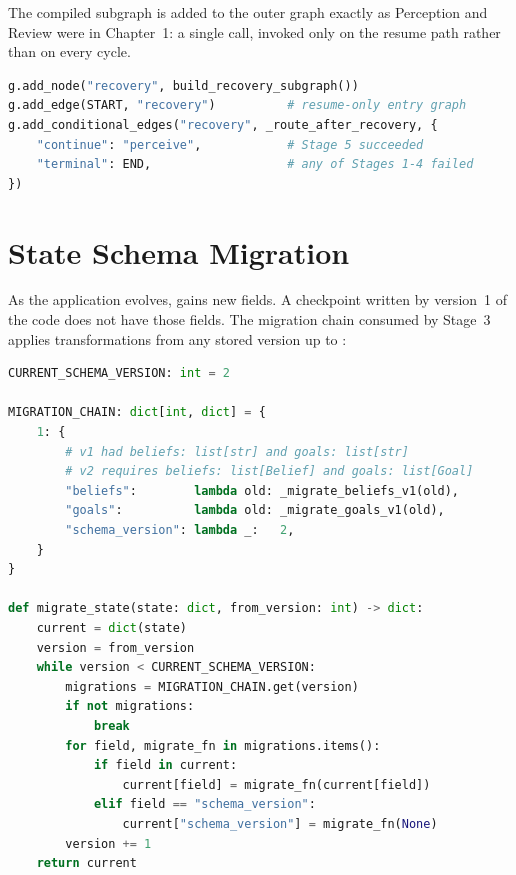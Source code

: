 The compiled subgraph is added to the outer graph exactly as Perception
and Review were in Chapter~1: a single  call, invoked
only on the resume path rather than on every cycle.

\begin{lstlisting}[language=Python,
    caption={Wiring RecoverySubgraph into a resume entry point},
    label={lst:recovery-wiring}]
g.add_node("recovery", build_recovery_subgraph())
g.add_edge(START, "recovery")          # resume-only entry graph
g.add_conditional_edges("recovery", _route_after_recovery, {
    "continue": "perceive",            # Stage 5 succeeded
    "terminal": END,                   # any of Stages 1-4 failed
})
\end{lstlisting}

\section{State Schema Migration}
\label{sec:migration}

As the application evolves,  gains new fields.  A
checkpoint written by version~1 of the code does not have those fields.
The migration chain consumed by Stage~3 applies transformations from any
stored version up to :

\begin{lstlisting}[language=Python,
    caption={Migration chain --- v1 to v2 (src/checkpointing.py)},
    label={lst:migration}]
CURRENT_SCHEMA_VERSION: int = 2

MIGRATION_CHAIN: dict[int, dict] = {
    1: {
        # v1 had beliefs: list[str] and goals: list[str]
        # v2 requires beliefs: list[Belief] and goals: list[Goal]
        "beliefs":        lambda old: _migrate_beliefs_v1(old),
        "goals":          lambda old: _migrate_goals_v1(old),
        "schema_version": lambda _:   2,
    }
}

def migrate_state(state: dict, from_version: int) -> dict:
    current = dict(state)
    version = from_version
    while version < CURRENT_SCHEMA_VERSION:
        migrations = MIGRATION_CHAIN.get(version)
        if not migrations:
            break
        for field, migrate_fn in migrations.items():
            if field in current:
                current[field] = migrate_fn(current[field])
            elif field == "schema_version":
                current["schema_version"] = migrate_fn(None)
        version += 1
    return current
\end{lstlisting}

